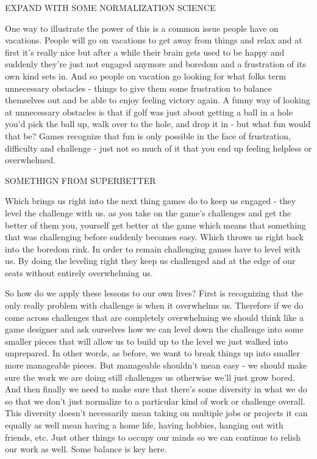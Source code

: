 \documentclass[11pt,a5paper]{book}
\begin{document}
EXPAND WITH SOME NORMALIZATION SCIENCE

One way to illustrate the power of this is a common issue people have on vacations. People will go on vacations to get away from things and relax and at first it's really nice but after a while their brain gets used to be happy and suddenly they're just not engaged anymore and boredom and a frustration of its own kind sets in. And so people on vacation go looking for what folks term unnecessary obstacles \cite{superbetter} - things to give them some frustration to balance themselves out and be able to enjoy feeling victory again. A funny way of looking at unnecessary obstacles is that if golf was just about getting a ball in a hole you'd pick the ball up, walk over to the hole, and drop it in - but what fun would that be? Games recognize that fun is only possible in the face of frustration, difficulty and challenge - just not so much of it that you end up feeling helpless or overwhelmed.
\newline

SOMETHIGN FROM SUPERBETTER

Which brings us right into the next thing games do to keep us engaged - they level the challenge with us. as you take on the game's challenges and get the better of them you, yourself get better at the game which means that something that was challenging before suddenly becomes easy. Which throws us right back into the boredom rink. In order to remain challenging games have to level with us. By doing the leveling right they keep us challenged and at the edge of our seats without entirely overwhelming us. 
\newline

So how do we apply these lessons to our own lives? First is recognizing that the only really problem with challenge is when it overwhelms us. Therefore if we do come across challenges that are completely overwhelming we should think like a game designer and ask ourselves how we can level down the challenge into some smaller pieces that will allow us to build up to the level we just walked into unprepared. In other words, as before, we want to break things up into smaller more manageable pieces. But manageable shouldn't mean easy - we should make sure the work we are doing still challenges us otherwise we'll just grow bored. And then finally we need to make sure that there's some diversity in what we do so that we don't just normalize to a particular kind of work or challenge overall. This diversity doesn't necessarily mean taking on multiple jobs or projects it can equally as well mean having a home life, having hobbies, hanging out with friends, etc. Just other things to occupy our minds so we can continue to relish our work as well. Some balance is key here. 
\newline
\end{document}
